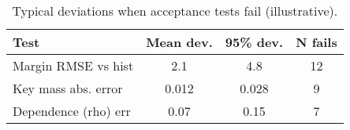 \begin{table}[t]
  \centering
  \small
  \caption{Typical deviations when acceptance tests fail (illustrative).}
  \label{tab:sim-fail}
  \begin{tabular}{lccc}
    \toprule
    Test & Mean dev. & 95\% dev. & N fails \\
    \midrule
    Margin RMSE vs hist & 2.1 & 4.8 & 12 \\
    Key mass abs. error & 0.012 & 0.028 & 9 \\
    Dependence (rho) err & 0.07 & 0.15 & 7 \\
    \bottomrule
  \end{tabular}
\end{table}
